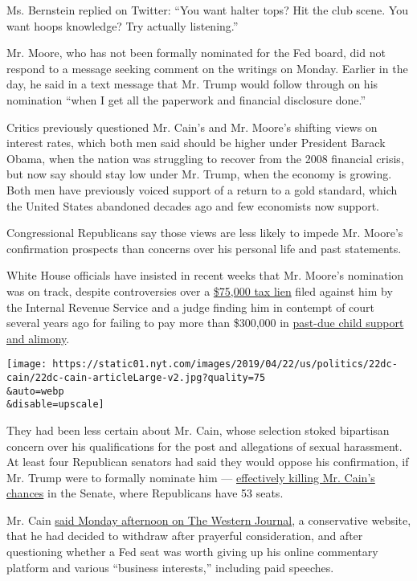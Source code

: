 Ms. Bernstein replied on Twitter: ``You want halter tops? Hit the club
scene. You want hoops knowledge? Try actually listening.''

Mr. Moore, who has not been formally nominated for the Fed board, did
not respond to a message seeking comment on the writings on Monday.
Earlier in the day, he said in a text message that Mr. Trump would
follow through on his nomination ``when I get all the paperwork and
financial disclosure done.''

Critics previously questioned Mr. Cain's and Mr. Moore's shifting views
on interest rates, which both men said should be higher under President
Barack Obama, when the nation was struggling to recover from the 2008
financial crisis, but now say should stay low under Mr. Trump, when the
economy is growing. Both men have previously voiced support of a return
to a gold standard, which the United States abandoned decades ago and
few economists now support.

Congressional Republicans say those views are less likely to impede Mr.
Moore's confirmation prospects than concerns over his personal life and
past statements.

White House officials have insisted in recent weeks that Mr. Moore's
nomination was on track, despite controversies over a
\href{https://www.nytimes.com/2019/03/27/us/politics/stephen-moore-taxes.html}{\$75,000
tax lien} filed against him by the Internal Revenue Service and a judge
finding him in contempt of court several years ago for failing to pay
more than \$300,000 in
\href{https://www.nytimes.com/2019/04/02/business/trump-fed-stephen-moore.html}{past-due
child support and alimony}.

\texttt{[image: https://static01.nyt.com/images/2019/04/22/us/politics/22dc-cain/22dc-cain-articleLarge-v2.jpg?quality=75\\\&auto=webp\\\&disable=upscale]}

They had been less certain about Mr. Cain, whose selection stoked
bipartisan concern over his qualifications for the post and allegations
of sexual harassment. At least four Republican senators had said they
would oppose his confirmation, if Mr. Trump were to formally nominate
him ---
\href{https://www.nytimes.com/2019/04/11/business/herman-cain-fed.html}{effectively
killing Mr. Cain's chances} in the Senate, where Republicans have 53
seats.

Mr. Cain
\href{https://www.westernjournal.com/hermancain/real-reasons-withdrew-fed-consideration-direct-source-need/}{said
Monday afternoon on The Western Journal}, a conservative website, that
he had decided to withdraw after prayerful consideration, and after
questioning whether a Fed seat was worth giving up his online commentary
platform and various ``business interests,'' including paid speeches.

